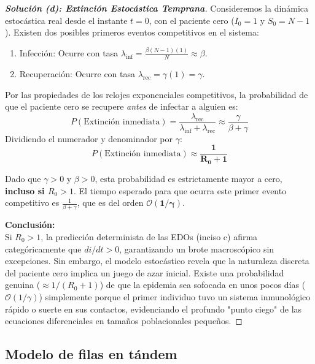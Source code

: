 \documentclass[10pt,a4paper]{article}
\begin{document}
\vspace{5mm}

\begin{proof}[\textbf{Solución (d): Extinción Estocástica Temprana}]
    Consideremos la dinámica estocástica real desde el instante $t=0$, con el paciente cero ($I_0 = 1$ y $S_0 = N-1$).
    Existen dos posibles primeros eventos competitivos en el sistema:
    \begin{enumerate}
        \item Infección: Ocurre con tasa $\lambda_{\text{inf}} = \frac{\beta (N-1)(1)}{N} \approx \beta$.
        \item Recuperación: Ocurre con tasa $\lambda_{\text{rec}} = \gamma (1) = \gamma$.
    \end{enumerate}
    
    Por las propiedades de los relojes exponenciales competitivos, la probabilidad de que el paciente cero se recupere \textit{antes} de infectar a alguien es:
    \[ P(\text{Extinción inmediata}) = \frac{\lambda_{\text{rec}}}{\lambda_{\text{inf}} + \lambda_{\text{rec}}} \approx \frac{\gamma}{\beta + \gamma} \]
    Dividiendo el numerador y denominador por $\gamma$:
    \[ P(\text{Extinción inmediata}) \approx \mathbf{\frac{1}{R_0 + 1}} \]
    
    Dado que $\gamma > 0$ y $\beta > 0$, esta probabilidad es estrictamente mayor a cero, \textbf{incluso si $R_0 > 1$}. El tiempo esperado para que ocurra este primer evento competitivo es $\frac{1}{\beta + \gamma}$, que es del orden $\mathbf{\mathcal{O}(1/\gamma)}$. 
    
    \textbf{Conclusión:} \\
    Si $R_0 > 1$, la predicción determinista de las EDOs (inciso c) afirma categóricamente que $di/dt > 0$, garantizando un brote macroscópico sin excepciones. Sin embargo, el modelo estocástico revela que la naturaleza discreta del paciente cero implica un juego de azar inicial. Existe una probabilidad genuina ($\approx 1/(R_0+1)$) de que la epidemia sea sofocada en unos pocos días ($\mathcal{O}(1/\gamma)$) simplemente porque el primer individuo tuvo un sistema inmunológico rápido o suerte en sus contactos, evidenciando el profundo "punto ciego" de las ecuaciones diferenciales en tamaños poblacionales pequeños.
\end{proof}



\newpage


\subsection{Modelo de filas en tándem}
\end{document}
